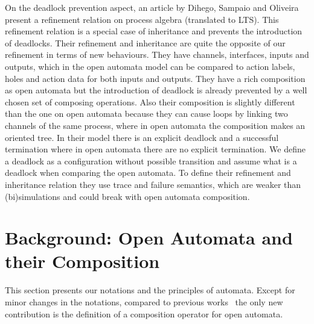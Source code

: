 \documentclass[runningheads]{llncs}
\begin{document}
On the deadlock prevention aspect, an article by Dihego, Sampaio and Oliveira \cite{DIHEGO2020110598} present a refinement relation on process algebra (translated to LTS).
This refinement relation is a special case of inheritance and prevents the introduction of deadlocks.
Their refinement and inheritance are quite the opposite of our refinement in terms of new behaviours.
They have channels, interfaces, inputs and outputs, which in the open automata model can be compared to action labels, holes and action data for both inputs and outputs.
They have a rich composition as open automata but the introduction of deadlock is already prevented by a well chosen set of composing operations.
Also their composition is slightly different than the one on open automata because they can cause loops by linking two channels of the same process, where in open automata the composition makes an oriented tree.
In their model there is an explicit deadlock and a successful termination where in open automata there are no explicit termination.
We define a deadlock as a configuration without possible transition and assume what is a deadlock when comparing the open automata.
To define their refinement and inheritance relation they use trace and failure semantics, which are weaker than (bi)simulations \cite{10.5555/640428.640430} and could break with open automata composition.


\section{Background: Open Automata and their Composition}\label{sec:background}

This section presents our notations and the principles of automata. Except for minor changes in the notations, compared to previous works~\cite{pnets} the only new contribution is the definition of a composition operator for open automata.
%

\end{document}
